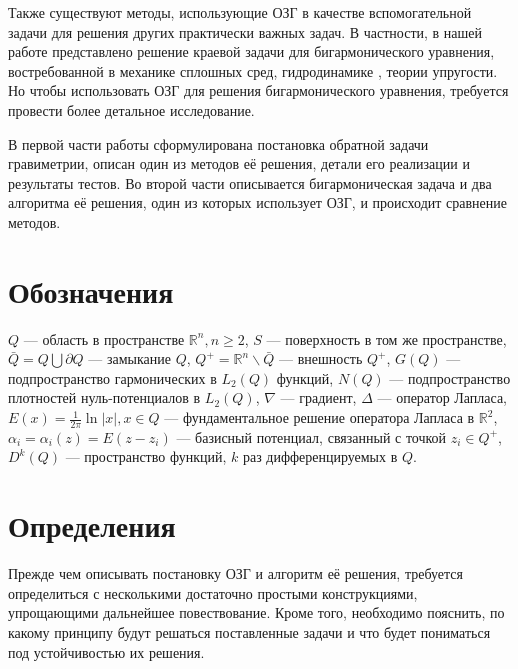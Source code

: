 \documentclass[a4paper]{article}
\newcommand{\R}[1]{\mathbb{R}^#1}
\begin{document}
Также существуют методы, использующие ОЗГ в качестве вспомогательной задачи для решения других практически важных задач.
В частности, в нашей работе представлено решение краевой задачи для бигармонического уравнения, востребованной в механике сплошных сред,
гидродинамике \cite{bigarm1},
теории упругости. Но чтобы использовать ОЗГ для решения бигармонического уравнения, требуется провести более детальное исследование.

В первой части работы сформулирована постановка обратной задачи гравиметрии, описан один из методов её решения,
детали его реализации и результаты тестов.
Во второй части описывается бигармоническая задача и два алгоритма её решения, один из которых использует ОЗГ, и происходит сравнение методов.

\section*{Обозначения}
$Q$ --- область в пространстве $\mathbb{R}^n, n\geq 2$, $S$ --- поверхность в том же пространстве,
$\bar Q = Q \bigcup \partial Q$ --- замыкание $Q$,
$Q^+= \R{n}\backslash \bar Q$ --- внешность $Q^+$,
$G(Q)$ --- подпространство гармонических в $L_2(Q)$ функций,
$N(Q)$ --- подпространство плотностей нуль-потенциалов в $L_2(Q)$,
$\nabla$ --- градиент,
$\Delta$ --- оператор Лапласа,
$E(x)= \frac{1}{2\pi}  \ln |x|, x \in Q$ --- фундаментальное решение оператора Лапласа в $\R{2}$,
$\alpha_i=\alpha_i(z)=E(z-z_i)$ --- базисный потенциал, связанный с точкой $z_i \in Q^+$,
$D^k(Q)$ --- пространство функций, $k$ раз дифференцируемых в $Q$.

\newpage
\section{Определения}
Прежде чем описывать постановку ОЗГ и алгоритм её решения,
требуется определиться с несколькими достаточно простыми конструкциями,
упрощающими дальнейшее повествование.
Кроме того, необходимо пояснить, по какому принципу будут решаться поставленные задачи и что будет пониматься под устойчивостью их решения.
\end{document}
